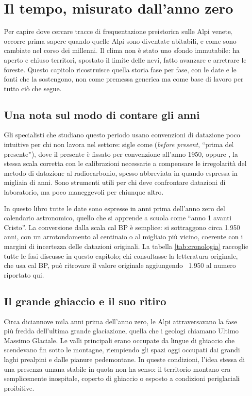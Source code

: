 \chapter{Il tempo, misurato dall'anno zero}
\label{cap:tempo_ghiacci_clima}

Per capire dove cercare tracce di frequentazione preistorica sulle Alpi venete, occorre prima sapere quando quelle Alpi sono diventate abitabili, e come sono cambiate nel corso dei millenni. Il clima non è stato uno sfondo immutabile: ha aperto e chiuso territori, spostato il limite delle nevi, fatto avanzare e arretrare le foreste. Questo capitolo ricostruisce quella storia fase per fase, con le date e le fonti che la sostengono, non come premessa generica ma come base di lavoro per tutto ciò che segue.

\section{Una nota sul modo di contare gli anni}

Gli specialisti che studiano questo periodo usano convenzioni di datazione poco intuitive per chi non lavora nel settore: sigle come  (\textit{before present}, ``prima del presente''), dove il presente è fissato per convenzione all'anno 1950, oppure , la stessa scala corretta con le calibrazioni necessarie a compensare le irregolarità del metodo di datazione al radiocarbonio, spesso abbreviata in  quando espressa in migliaia di anni. Sono strumenti utili per chi deve confrontare datazioni di laboratorio, ma poco maneggevoli per chiunque altro.

In questo libro tutte le date sono espresse in anni prima dell'anno zero del calendario astronomico, quello che si apprende a scuola come ``anno 1 avanti Cristo''. La conversione dalla scala cal BP è semplice: si sottraggono circa 1.950 anni, con un arrotondamento al centinaio o al migliaio più vicino, coerente con i margini di incertezza delle datazioni originali. La tabella \ref{tab:cronologia} raccoglie tutte le fasi discusse in questo capitolo; chi consultasse la letteratura originale, che usa cal BP, può ritrovare il valore originale aggiungendo ~1.950 al numero riportato qui.

\section{Il grande ghiaccio e il suo ritiro}

Circa diciannove mila anni prima dell'anno zero, le Alpi attraversavano la fase più fredda dell'ultima grande glaciazione, quella che i geologi chiamano Ultimo Massimo Glaciale. Le valli principali erano occupate da lingue di ghiaccio che scendevano fin sotto le montagne, riempiendo gli spazi oggi occupati dai grandi laghi prealpini e dalle pianure pedemontane. In queste condizioni, l'idea stessa di una presenza umana stabile in quota non ha senso: il territorio montano era semplicemente inospitale, coperto di ghiaccio o esposto a condizioni periglaciali proibitive.

